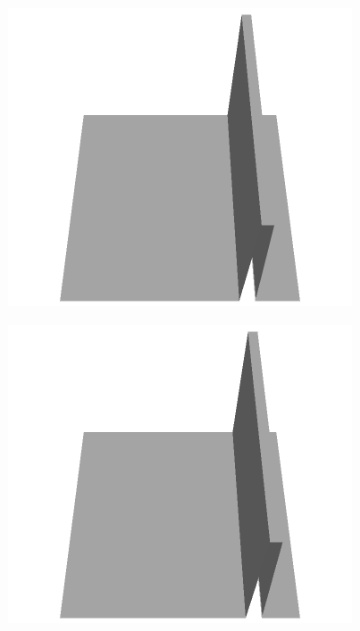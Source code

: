 \documentclass[../document.tex]{subfiles}
\begin{document}
\begin{figure}[H]
    \begin{subfigure}[b]{0.24\textwidth}
    \includegraphics[width=\linewidth]{../img/5/custom_patches/walls_front/all/30-3d.png}
    \end{subfigure}
    \begin{subfigure}[b]{0.24\textwidth}
    \includegraphics[width=\linewidth]{../img/5/custom_patches/walls_front/all/25-3d.png}
    \end{subfigure}
    \begin{subfigure}[b]{0.24\textwidth}

\end{subfigure}
\end{figure}
\end{document}
